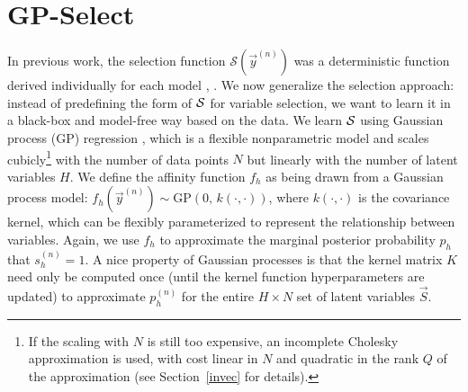 \section{GP-Select}
\label{gp-select}
%
In previous work, the selection function $\mathcal{S}(\vec{y}^{(n)})$ 
was a deterministic function derived  individually for each model 
\citep[see e.g.][]{SheltonEtAl2011, SheltonEtAl2012, DaiLucke2012a, DaiLucke2012b,
BornscheinEtAl2013, SheikhEtAl2014, SheltonEtAl2015}, .
%
We now generalize the selection approach:  %
instead of predefining the form of $\mathcal{S}$ for variable selection, we want
to learn it in a black-box and model-free way based on the data.
%
We learn $\mathcal{S}$  using Gaussian process (GP) regression
\citep[e.g.][]{RasmussenGPbook}, which is a flexible nonparametric model 
and scales cubicly\footnote{If the scaling with $N$ is still too expensive, an incomplete Cholesky approximation is used, with cost linear in $N$ and quadratic in the rank $Q$ of the approximation (see Section~\ref{invec} for details).} with the number of data points $N$ but linearly with the number of latent variables $H$.  
%
%
%
%
We define the affinity function $f_h$ as being drawn from a Gaussian process model: 
$f_h(\vec{y}^{(n)}) \sim \text{GP}\left(0, \, k(\cdot,\cdot) \right)$, where $k(\cdot, \cdot)$ is the covariance kernel, 
which can be flexibly parameterized to represent the relationship between variables.
Again, we use $f_h$ to approximate the marginal posterior probability $p_h$ that $s_h^{(n)}=1$.
%
A nice property of Gaussian processes is that the kernel matrix $K$ need only be computed once (until the kernel function hyperparameters are updated) 
to approximate $p_h^{(n)}$ for the entire $H\times N$ set of latent variables $\vec{S}$.

